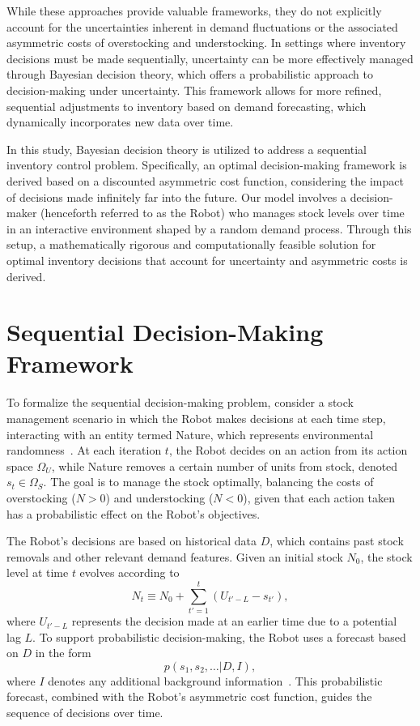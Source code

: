 \documentclass[a4paper,12pt]{article}
\theoremstyle{definition}
\begin{document}
	While these approaches provide valuable frameworks, they do not explicitly account for the uncertainties inherent in demand fluctuations or the associated asymmetric costs of overstocking and understocking. In settings where inventory decisions must be made sequentially, uncertainty can be more effectively managed through Bayesian decision theory, which offers a probabilistic approach to decision-making under uncertainty. This framework allows for more refined, sequential adjustments to inventory based on demand forecasting, which dynamically incorporates new data over time.
	
	In this study, Bayesian decision theory is utilized to address a sequential inventory control problem. Specifically, an optimal decision-making framework is derived based on a discounted asymmetric cost function, considering the impact of decisions made infinitely far into the future. Our model involves a decision-maker (henceforth referred to as the Robot) who manages stock levels over time in an interactive environment shaped by a random demand process. Through this setup, a mathematically rigorous and computationally feasible solution for optimal inventory decisions that account for uncertainty and asymmetric costs is derived.
	
	\section{Sequential Decision-Making Framework}
	To formalize the sequential decision-making problem, consider a stock management scenario in which the Robot makes decisions at each time step, interacting with an entity termed Nature, which represents environmental randomness~\citep{lavalle2006}. At each iteration $t$, the Robot decides on an action from its action space $\Omega_U$, while Nature removes a certain number of units from stock, denoted $s_t \in \Omega_S$. The goal is to manage the stock optimally, balancing the costs of overstocking ($N > 0$) and understocking ($N < 0$), given that each action taken has a probabilistic effect on the Robot’s objectives.
	
	The Robot’s decisions are based on historical data $D$, which contains past stock removals and other relevant demand features. Given an initial stock $N_0$, the stock level at time $t$ evolves according to
	\begin{equation}
		N_t \equiv N_0 + \sum_{t'=1}^{t} (U_{t'-L} - s_{t'}),
	\end{equation}
	where $U_{t'-L}$ represents the decision made at an earlier time due to a potential lag $L$. To support probabilistic decision-making, the Robot uses a forecast based on $D$ in the form
	\begin{equation}
		p(s_1, s_2, \dots | D, I),
	\end{equation}
	where $I$ denotes any additional background information~\citep{Sivia2006}. This probabilistic forecast, combined with the Robot's asymmetric cost function, guides the sequence of decisions over time.
	
\end{document}
